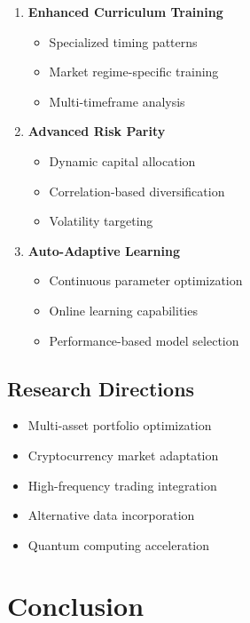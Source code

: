 \documentclass[11pt,a4paper]{article}
\begin{document}
\begin{enumerate}
    \item \textbf{Enhanced Curriculum Training}
    \begin{itemize}
        \item Specialized timing patterns
        \item Market regime-specific training
        \item Multi-timeframe analysis
    \end{itemize}

    \item \textbf{Advanced Risk Parity}
    \begin{itemize}
        \item Dynamic capital allocation
        \item Correlation-based diversification
        \item Volatility targeting
    \end{itemize}

    \item \textbf{Auto-Adaptive Learning}
    \begin{itemize}
        \item Continuous parameter optimization
        \item Online learning capabilities
        \item Performance-based model selection
    \end{itemize}
\end{enumerate}

\subsection{Research Directions}

\begin{itemize}
    \item Multi-asset portfolio optimization
    \item Cryptocurrency market adaptation
    \item High-frequency trading integration
    \item Alternative data incorporation
    \item Quantum computing acceleration
\end{itemize}

\section{Conclusion}
\end{document}
